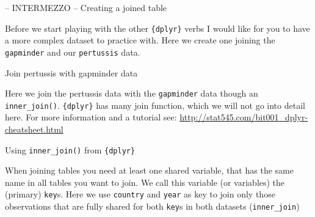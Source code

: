 \documentclass[ignorenonframetext,]{beamer}
\newenvironment{Shaded}{\begin{snugshade}}{\end{snugshade}}
\newcommand{\CommentTok}[1]{\textcolor[rgb]{0.56,0.35,0.01}{\textit{#1}}}
\newcommand{\DataTypeTok}[1]{\textcolor[rgb]{0.13,0.29,0.53}{#1}}
\newcommand{\KeywordTok}[1]{\textcolor[rgb]{0.13,0.29,0.53}{\textbf{#1}}}
\newcommand{\NormalTok}[1]{#1}
\newcommand{\OperatorTok}[1]{\textcolor[rgb]{0.81,0.36,0.00}{\textbf{#1}}}
\newcommand{\StringTok}[1]{\textcolor[rgb]{0.31,0.60,0.02}{#1}}
\begin{document}
\begin{frame}[fragile]{-- INTERMEZZO -- Creating a joined table}
\protect\hypertarget{intermezzo-creating-a-joined-table}{}

Before we start playing with the other \texttt{\{dplyr\}} verbs I would
like for you to have a more complex dataset to practice with. Here we
create one joining the \texttt{gapminder} and our \texttt{pertussis}
data.

\begin{block}{Join pertussis with gapminder data}

Here we join the pertussis data with the \texttt{gapminder} data though
an \texttt{inner\_join()}. \texttt{\{dplyr\}} has many join function,
which we will not go into detail here. For more information and a
tutorial see: \url{http://stat545.com/bit001_dplyr-cheatsheet.html}

\begin{Shaded}
\end{Shaded}

\end{block}

\begin{block}{Using \texttt{inner\_join()} from \texttt{\{dplyr\}}}

When joining tables you need at least one shared variable, that has the
same name in all tables you want to join. We call this variable (or
variables) the (primary) \texttt{key}s. Here we use \texttt{country} and
\texttt{year} as key to join only those observations that are fully
shared for both \texttt{key}s in both datasets (\texttt{inner\_join})

\begin{Shaded}
\end{Shaded}


\end{block}
\end{frame}
\end{document}
